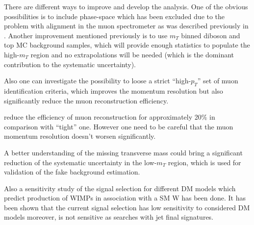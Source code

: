 There are different ways to improve and develop the analysis.
One of the obvious possibilities is to include phase-space which has been excluded due
to the problem with alignment in the muon spectrometer as was described previously in .
Another improvement mentioned previously is to use $m_T$ binned diboson and top MC background samples, which will provide enough statistics to populate the high-$m_T$ region and no extrapolations will be needed (which is the dominant contribution to the systematic uncertainty).

Also one can investigate the possibility to loose a strict ``high-$p_T$'' set of muon identification criteria, which improves the momentum resolution but also significantly reduce the muon reconstruction efficiency.

reduce the efficiency of muon reconstruction for approximately 20$\%$ in comparison with ``tight'' one. However one need to be careful that the muon momentum resolution doesn't worsen significantly.

A better understanding of the missing transverse mass could bring a significant reduction of the systematic uncertainty in the low-$m_T$ region, which is used for validation of the fake background estimation.

Also a sensitivity study of the signal selection for different DM models which predict production of WIMPs in association with a SM W has been done.
It has been shown that the current signal selection has low sensitivity to considered DM models moreover, is not sensitive as searches with jet final signatures.
